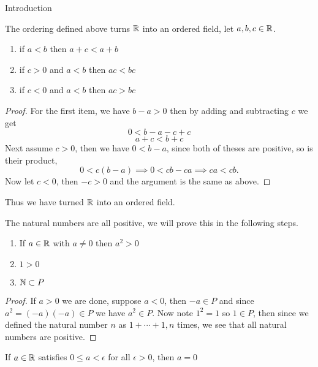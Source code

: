 \begin{chapter}{Introduction}
    
    \begin{lem}
        The ordering defined above turns $\mathbb{R}$ into an ordered field, let $a, b, c \in \mathbb{R}$.
        
        \begin{enumerate}
            \item if $a < b$ then $a + c < a + b$
            \item if $c > 0 $ and $a < b$ then $ac < bc$
            \item if $c < 0$ and $ a < b$ then $ac > bc$
        \end{enumerate}
    \end{lem}

    
    \begin{proof}
        For the first item, we have $b - a > 0$ then by adding and subtracting $c$ we get 
        \[ 0 < b - a - c + c \] 
        \[a + c < b + c\]
        Next assume $c > 0$, then we have $0 < b - a$, since both of theses are positive, so is their product, 
        \[0 < c(b - a) \implies  0 < cb - ca \implies ca < cb.\]
        Now let $c < 0$, then $-c >0$ and the argument is the same as above.  
    \end{proof}

    Thus we have turned $\mathbb{R}$ into an ordered field. 

    
    \begin{thm}
        The natural numbers are all positive, we will prove this in the following steps. 
        \begin{enumerate}
            \item If $a \in \mathbb{R}$ with $a \neq 0$ then $a^2 > 0$
            \item $1 > 0$
            \item $\mathbb{N} \subset P$ 
        \end{enumerate}
        
    \end{thm}

    
    \begin{proof}
        If $a > 0$ we are done, suppose $a < 0$, then $-a \in P$ and since 
        $a^2 = (-a)(-a) \in P$ we have $a^2 \in P$. Now note $1^2 = 1$ so $1 \in P$, 
        then since we defined the natural number $n$ as $1 + \cdots + 1, n$ times, 
        we see that all natural numbers are positive. 
    \end{proof}

    
    \begin{thm}
        If $a \in \mathbb{R}$ satisfies $0 \leq a < \epsilon$ for all $\epsilon > 0$, then $a = 0$
    \end{thm}


\end{chapter}
